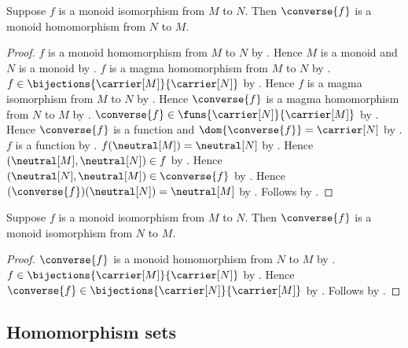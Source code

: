 \begin{theorem}\label{monoid_isomorphism_converse_hom}
    Suppose $f$ is a monoid isomorphism from $M$ to $N$.
    Then $\converse{f}$ is a monoid homomorphism from $N$ to $M$.
\end{theorem}
\begin{proof}
    $f$ is a monoid homomorphism from $M$ to $N$ by
        .
    Hence $M$ is a monoid and $N$ is a monoid by
        .
    $f$ is a magma homomorphism from $M$ to $N$ by
        .
    $f\in\bijections{\carrier[M]}{\carrier[N]}$ by
        .
    Hence $f$ is a magma isomorphism from $M$ to $N$ by
        .
    Hence $\converse{f}$ is a magma homomorphism from $N$ to $M$ by
        .
    $\converse{f}\in\funs{\carrier[N]}{\carrier[M]}$ by
        .
    Hence $\converse{f}$ is a function and
        $\dom{\converse{f}}=\carrier[N]$ by .
    $f$ is a function by .
    $f(\neutral[M])=\neutral[N]$ by .
    Hence $(\neutral[M],\neutral[N])\in f$ by
        .
    Hence $(\neutral[N],\neutral[M])\in\converse{f}$ by
        .
    Hence $(\converse{f})(\neutral[N])=\neutral[M]$ by
        .
    Follows by .
\end{proof}

\begin{theorem}\label{monoid_isomorphism_converse}
    Suppose $f$ is a monoid isomorphism from $M$ to $N$.
    Then $\converse{f}$ is a monoid isomorphism from $N$ to $M$.
\end{theorem}
\begin{proof}
    $\converse{f}$ is a monoid homomorphism from $N$ to $M$ by
        .
    $f\in\bijections{\carrier[M]}{\carrier[N]}$ by
        .
    Hence $\converse{f}\in\bijections{\carrier[N]}{\carrier[M]}$ by
        .
    Follows by .
\end{proof}

\subsection{Homomorphism sets}

